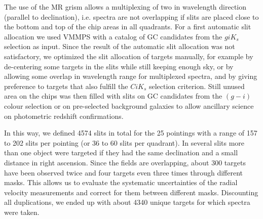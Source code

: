 \documentclass[useAMS,usenatbib]{mn2e}
\begin{document}
The use of the MR grism allows a multiplexing of two in wavelength direction (parallel to declination), i.e. spectra are not overlapping if slits are placed close to the bottom and top of the chip areas in all quadrants. 
For a first automatic slit allocation we used VMMPS with a catalog of GC candidates from the $giK_s$ selection as input. Since the result of the automatic slit allocation was not satisfactory, we optimized the slit allocation of targets manually, for example by de-centering some targets in the slits while still keeping enough sky, or by allowing some overlap in wavelength range for multiplexed spectra, and by giving preference to targets that also fulfill the $CiK_s$ selection criterion. Still unused area on the chips was then filled with slits on GC candidates from the $(g-i)$ colour selection or on pre-selected background galaxies to allow ancillary science on photometric redshift confirmations.

In this way, we defined 4574 slits in total for the 25 pointings with a range of 157 to 202 slits per pointing (or 36 to 60 slits per quadrant). In several slits more than one object were targeted if they had the same declination and a small distance in right ascension. Since the fields are overlapping, about 300 targets have been observed twice and four targets even three times through different masks. This allows us to evaluate the systematic uncertainties of the radial velocity measurements and correct for them between different masks. Discounting all duplications, we ended up with about 4340 unique targets
for which spectra were taken. 

\end{document}
